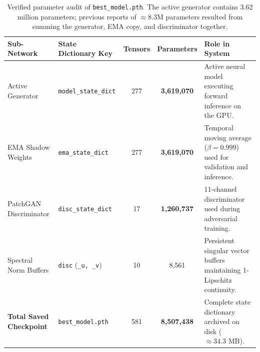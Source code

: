 \begin{table}[htbp]
\centering
\small
\begin{tabularx}{\textwidth}{llccX}
\toprule
\textbf{Sub-Network} & \textbf{State Dictionary Key} & \textbf{Tensors} & \textbf{Parameters} & \textbf{Role in System} \\
\midrule
Active Generator & \texttt{model\_state\_dict} & 277 & \textbf{3,619,070} & Active neural model executing forward inference on the GPU. \\
EMA Shadow Weights & \texttt{ema\_state\_dict} & 277 & \textbf{3,619,070} & Temporal moving average ($\beta=0.999$) used for validation and inference. \\
PatchGAN Discriminator & \texttt{disc\_state\_dict} & 17 & \textbf{1,260,737} & 11-channel discriminator used during adversarial training. \\
Spectral Norm Buffers & \texttt{disc} (\texttt{\_u, \_v}) & 10 & 8,561 & Persistent singular vector buffers maintaining 1-Lipschitz continuity. \\
\midrule
\textbf{Total Saved Checkpoint} & \texttt{best\_model.pth} & 581 & \textbf{8,507,438} & Complete state dictionary archived on disk ($\approx 34.3\text{ MB}$). \\
\bottomrule
\end{tabularx}
\caption{Verified parameter audit of \texttt{best\_model.pth}. The active generator contains 3.62 million parameters; previous reports of $\approx 8.3\text{M}$ parameters resulted from summing the generator, EMA copy, and discriminator together.}
\label{tab:param_audit}
\end{table}

